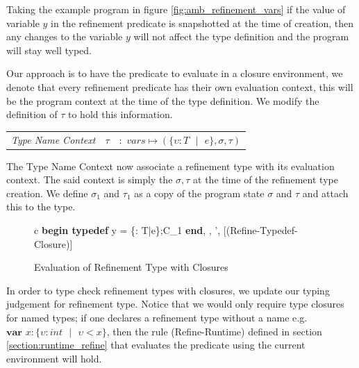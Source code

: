 \documentclass[a4paper,12pt]{report}
\begin{document}
\par
Taking the example program in figure \ref{fig:amb_refinement_vars} if the 
value of variable $y$ in the refinement predicate is snapshotted at the time of 
creation, then any changes to the variable $y$ will not 
affect the type definition and the program will stay well typed.

\par
Our approach is to have the predicate to evaluate in a closure environment, we 
denote that every refinement predicate has their own evaluation context, this 
will be the program context at the time of the type definition. We modify the 
definition of $\tau$ to hold this information.

\begin{center}
   \begin{tabular} {c c c}
     \textit{Type Name Context} & $\tau$& $:$ 
     $vars \mapsto (\{\upsilon : T\text{ }|\text{ }e\}, \sigma, \tau)$ \\
   \end{tabular}
\end{center}

The Type Name Context now associate a refinement type with its 
evaluation context. The said context is simply the $\sigma, \tau$ at the time of 
the refinement type creation. 
We define $\sigma_1$ and $\tau_1$ as a copy of the program state $\sigma$ and 
$\tau$ and attach this to the type. 

\begin{figure}[H]
  \begin{center}
    \begin{tabular} {c}
      {\langle\textbf{begin typedef } y = \{\upsilon : T\text{ }|\text{ }e\};C_1\textbf{ end}, 
      \sigma, \tau \rangle \longrightarrow \langle \sigma', \tau \rangle} [(Refine-Typedef-Closure)]
    \end{tabular}
  \end{center}
  \caption{Evaluation of Refinement Type with Closures}
\end{figure}

\par
In order to type check refinement types with closures, we update our typing 
judgement for refinement type. Notice that we would only require type 
closures for named types; if one declares a refinement type without a name e.g.  
$\textbf{var }x : \{\upsilon : int\text{ }|\text{ }\upsilon < x\}$, then the rule 
(Refine-Runtime) defined in section \ref{section:runtime_refine} that evaluates 
the predicate using the current environment will hold. 
\end{document}
